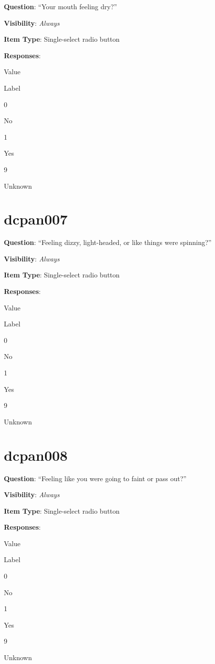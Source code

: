\documentclass[]{book}
\begin{document}
\textbf{Question}: ``Your mouth feeling dry?''

\textbf{Visibility}: \emph{Always}

\textbf{Item Type}: Single-select radio button

\textbf{Responses}:

Value

Label

0

No

1

Yes

9

Unknown

\hypertarget{dcpan007}{%
\section{dcpan007}\label{dcpan007}}

\textbf{Question}: ``Feeling dizzy, light-headed, or like things were spinning?''

\textbf{Visibility}: \emph{Always}

\textbf{Item Type}: Single-select radio button

\textbf{Responses}:

Value

Label

0

No

1

Yes

9

Unknown

\hypertarget{dcpan008}{%
\section{dcpan008}\label{dcpan008}}

\textbf{Question}: ``Feeling like you were going to faint or pass out?''

\textbf{Visibility}: \emph{Always}

\textbf{Item Type}: Single-select radio button

\textbf{Responses}:

Value

Label

0

No

1

Yes

9

Unknown
\end{document}
